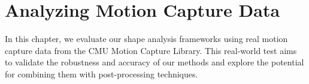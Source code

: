 \chapter{Analyzing Motion Capture Data}
\label{ch:analyzing-motion-capture-data}

In this chapter, we evaluate our shape analysis frameworks using real motion capture data from the CMU Motion Capture Library. This real-world test aims to validate the robustness and accuracy of our methods and explore the potential for combining them with post-processing techniques.




